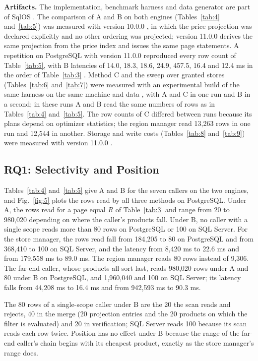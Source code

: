 \documentclass[conference]{IEEEtran}
\begin{document}
\textbf{Artifacts.} The implementation, benchmark harness and data generator are part of SqlOS \cite{ref18}. The comparison of A and B on both engines (Tables~\ref{tab:4} and~\ref{tab:5}) was measured with version 10.0.0 \cite{ref19}, in which the price projection was declared explicitly and no other ordering was projected; version 11.0.0 derives the same projection from the price index and issues the same page statements. A repetition on PostgreSQL with version 11.0.0 reproduced every row count of Table~\ref{tab:5}, with B latencies of 14.0, 18.3, 18.6, 24.9, 457.5, 16.4 and 12.4 ms in the order of Table~\ref{tab:3} \cite{ref20}. Method C and the sweep over granted stores (Tables~\ref{tab:6} and~\ref{tab:7}) were measured with an experimental build of the same harness on the same machine and data \cite{ref21}, with A and C in one run and B in a second; in these runs A and B read the same numbers of rows as in Tables~\ref{tab:4} and~\ref{tab:5}. The row counts of C differed between runs because its plans depend on optimizer statistics; the region manager read 13,263 rows in one run and 12,544 in another. Storage and write costs (Tables~\ref{tab:8} and~\ref{tab:9}) were measured with version 11.0.0 \cite{ref20}.

\subsection{RQ1: Selectivity and Position}\label{sec-7-3}

Tables~\ref{tab:4} and~\ref{tab:5} give A and B for the seven callers on the two engines, and Fig.~\ref{fig:5} plots the rows read by all three methods on PostgreSQL. Under A, the rows read for a page equal \(R\) of Table~\ref{tab:3} and range from 20 to 980,020 depending on where the caller's products fall. Under B, no caller with a single scope reads more than 80 rows on PostgreSQL or 100 on SQL Server. For the store manager, the rows read fall from 184,205 to 80 on PostgreSQL and from 368,410 to 100 on SQL Server, and the latency from 8,420 ms to 22.6 ms and from 179,558 ms to 89.0 ms. The region manager reads 80 rows instead of 9,306. The far-end caller, whose products all sort last, reads 980,020 rows under A and 80 under B on PostgreSQL, and 1,960,040 and 100 on SQL Server; its latency falls from 44,208 ms to 16.4 ms and from 942,593 ms to 90.3 ms.

The 80 rows of a single-scope caller under B are the 20 the scan reads and rejects, 40 in the merge (20 projection entries and the 20 products on which the filter is evaluated) and 20 in verification; SQL Server reads 100 because its scan reads each row twice. Position has no effect under B because the range of the far-end caller's chain begins with its cheapest product, exactly as the store manager's range does.
\end{document}
